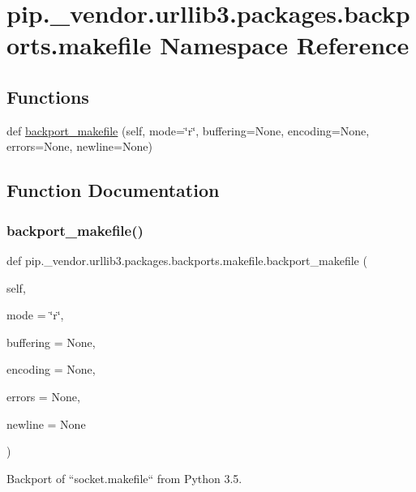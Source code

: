 \hypertarget{namespacepip_1_1__vendor_1_1urllib3_1_1packages_1_1backports_1_1makefile}{}\section{pip.\+\_\+vendor.\+urllib3.\+packages.\+backports.\+makefile Namespace Reference}
\label{namespacepip_1_1__vendor_1_1urllib3_1_1packages_1_1backports_1_1makefile}
\subsection*{Functions}
\begin{DoxyCompactItemize}
\item 
def \hyperlink{namespacepip_1_1__vendor_1_1urllib3_1_1packages_1_1backports_1_1makefile_a7835d3a7eb3aefdd23310427f4b00a55}{backport\+\_\+makefile} (self, mode=\char`\"{}r\char`\"{}, buffering=None, encoding=None, errors=None, newline=None)
\end{DoxyCompactItemize}


\subsection{Function Documentation}
\mbox{\label{namespacepip_1_1__vendor_1_1urllib3_1_1packages_1_1backports_1_1makefile_a7835d3a7eb3aefdd23310427f4b00a55}} 
\subsubsection{\texorpdfstring{backport\+\_\+makefile()}{backport\_makefile()}}
{\footnotesize\ttfamily def pip.\+\_\+vendor.\+urllib3.\+packages.\+backports.\+makefile.\+backport\+\_\+makefile (\begin{DoxyParamCaption}\item[{}]{self,  }\item[{}]{mode = {\ttfamily \char`\"{}r\char`\"{}},  }\item[{}]{buffering = {\ttfamily None},  }\item[{}]{encoding = {\ttfamily None},  }\item[{}]{errors = {\ttfamily None},  }\item[{}]{newline = {\ttfamily None} }\end{DoxyParamCaption})}

\begin{DoxyVerb}Backport of ``socket.makefile`` from Python 3.5.
\end{DoxyVerb}
 